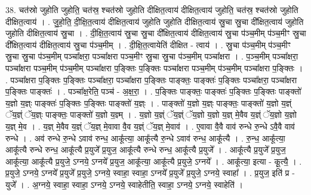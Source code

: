 \documentclass[17pt]{extarticle}
\begin{document}
38. चत॑स्रो जुहोति जुहोति॒ चत॑स्र॒ श्चत॑स्रो जुहोति दीक्षित॒त्वाय॑ दीक्षित॒त्वाय॑ जुहोति॒ चत॑स्र॒ श्चत॑स्रो जुहोति दीक्षित॒त्वाय॑ । . जु॒हो॒ति॒ दी॒क्षि॒त॒त्वाय॑ दीक्षित॒त्वाय॑ जुहोति जुहोति दीक्षित॒त्वाय॑ स्रु॒चा स्रु॒चा दी᳚क्षित॒त्वाय॑ जुहोति जुहोति दीक्षित॒त्वाय॑ स्रु॒चा । . दी॒क्षि॒त॒त्वाय॑ स्रु॒चा स्रु॒चा दी᳚क्षित॒त्वाय॑ दीक्षित॒त्वाय॑ स्रु॒चा प॑ञ्च॒मीम् प॑ञ्च॒मीꣳ स्रु॒चा दी᳚क्षित॒त्वाय॑ दीक्षित॒त्वाय॑ स्रु॒चा प॑ञ्च॒मीम् । . दी॒क्षि॒त॒त्वायेति॑ दीक्षित - त्वाय॑ । . स्रु॒चा प॑ञ्च॒मीम् प॑ञ्च॒मीꣳ स्रु॒चा स्रु॒चा प॑ञ्च॒मीम् पञ्चा᳚क्षरा॒ पञ्चा᳚क्षरा पञ्च॒मीꣳ स्रु॒चा स्रु॒चा प॑ञ्च॒मीम् पञ्चा᳚क्षरा । . प॒ञ्च॒मीम् पञ्चा᳚क्षरा॒ पञ्चा᳚क्षरा पञ्च॒मीम् प॑ञ्च॒मीम् पञ्चा᳚क्षरा प॒ङ्क्तिः प॒ङ्क्तिः पञ्चा᳚क्षरा पञ्च॒मीम् प॑ञ्च॒मीम् पञ्चा᳚क्षरा प॒ङ्क्तिः । . पञ्चा᳚क्षरा प॒ङ्क्तिः प॒ङ्क्तिः पञ्चा᳚क्षरा॒ पञ्चा᳚क्षरा प॒ङ्क्तिः पाङ्क्तः॒ पाङ्क्तः॑ प॒ङ्क्तिः पञ्चा᳚क्षरा॒ पञ्चा᳚क्षरा प॒ङ्क्तिः पाङ्क्तः॑ । . पञ्चा᳚क्ष॒रेति॒ पञ्च॑ - अ॒क्ष॒रा॒ । . प॒ङ्क्तिः पाङ्क्तः॒ पाङ्क्तः॑ प॒ङ्क्तिः प॒ङ्क्तिः पाङ्क्तो॑ य॒ज्ञो य॒ज्ञ्ः पाङ्क्तः॑ प॒ङ्क्तिः प॒ङ्क्तिः पाङ्क्तो॑ य॒ज्ञ्ः । . पाङ्क्तो॑ य॒ज्ञो य॒ज्ञ्ः पाङ्क्तः॒ पाङ्क्तो॑ य॒ज्ञो य॒ज्ञ्ं ॅय॒ज्ञ्ं ॅय॒ज्ञ्ः पाङ्क्तः॒ पाङ्क्तो॑ य॒ज्ञो य॒ज्ञ्म् । . य॒ज्ञो य॒ज्ञ्ं ॅय॒ज्ञ्ं ॅय॒ज्ञो य॒ज्ञो य॒ज्ञ् मे॒वैव य॒ज्ञ्ं ॅय॒ज्ञो य॒ज्ञो य॒ज्ञ् मे॒व । . य॒ज्ञ् मे॒वैव य॒ज्ञ्ं ॅय॒ज्ञ् मे॒वावा वै॒व य॒ज्ञ्ं ॅय॒ज्ञ् मे॒वाव॑ । . ए॒वावा वै॒वै वाव॑ रुन्धे रु॒न्धे ऽवै॒वै वाव॑ रुन्धे । . अव॑ रुन्धे रु॒न्धे ऽवाव॑ रुन्ध॒ आकू᳚त्या॒ आकू᳚त्यै रु॒न्धे ऽवाव॑ रुन्ध॒ आकू᳚त्यै । . रु॒न्ध॒ आकू᳚त्या॒ आकू᳚त्यै रुन्धे रुन्ध॒ आकू᳚त्यै प्र॒युजे᳚ प्र॒युज॒ आकू᳚त्यै रुन्धे रुन्ध॒ आकू᳚त्यै प्र॒युजे᳚ । . आकू᳚त्यै प्र॒युजे᳚ प्र॒युज॒ आकू᳚त्या॒ आकू᳚त्यै प्र॒युजे॒ ऽग्नये॒ ऽग्नये᳚ प्र॒युज॒ आकू᳚त्या॒ आकू᳚त्यै प्र॒युजे॒ ऽग्नये᳚ । . आकू᳚त्या॒ इत्या - कू॒त्यै॒ । . प्र॒युजे॒ ऽग्नये॒ ऽग्नये᳚ प्र॒युजे᳚ प्र॒युजे॒ ऽग्नये॒ स्वाहा॒ स्वाहा॒ ऽग्नये᳚ प्र॒युजे᳚ प्र॒युजे॒ ऽग्नये॒ स्वाहा᳚ । . प्र॒युज॒ इति॑ प्र - युजे᳚ । . अ॒ग्नये॒ स्वाहा॒ स्वाहा॒ ऽग्नये॒ ऽग्नये॒ स्वाहेतीति॒ स्वाहा॒ ऽग्नये॒ ऽग्नये॒ स्वाहेति॑ । \newline
\pagebreak
{}
\end{document}
